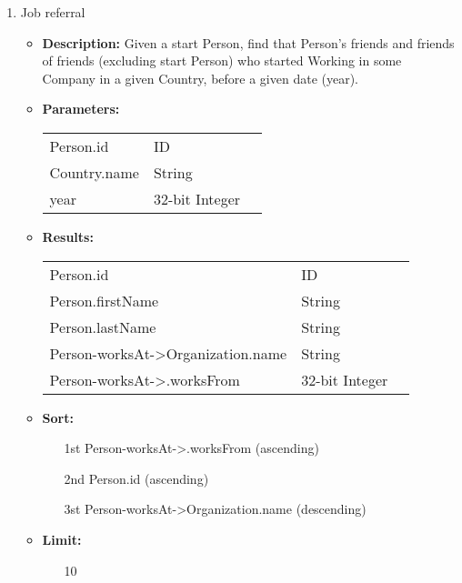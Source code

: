 {\begin{enumerate}
    \item Job referral
        \begin{itemize}
            \item \textbf{Description:}
                Given a start Person, find that Person's friends and friends of
                friends (excluding start Person) who started Working in some
                Company in a given Country, before a given date (year).
            \item \textbf{Parameters:} \\
                \begin{tabular}{lll}
                    Person.id 	 				& ID & \parbox[t]{20cm}{\par \strut} \\
                    Country.name 	 			& String & \parbox[t]{20cm}{\par \strut} \\
                    year 		 				& 32-bit Integer & \parbox[t]{20cm}{\par \strut} \\
                \end{tabular}
            \item \textbf{Results:} \\
                \begin{tabular}{lll}
                    Person.id 	 						& ID & \parbox[t]{20cm}{\par \strut} \\
                    Person.firstName 	 				& String & \parbox[t]{20cm}{\par \strut} \\
                    Person.lastName 	 				& String & \parbox[t]{20cm}{\par \strut} \\
                    Person-worksAt->Organization.name 	& String & \parbox[t]{20cm}{\par \strut} \\
                    Person-worksAt->.worksFrom 	 		& 32-bit Integer & \parbox[t]{20cm}{\par \strut} \\
                \end{tabular}
            \item \textbf{Sort:}
                  \begin{itemize}
                    \item[1st] Person-worksAt->.worksFrom (ascending)
                    \item[2nd] Person.id (ascending)
                    \item[3st] Person-worksAt->Organization.name (descending)
                  \end{itemize}
            \item \textbf{Limit:}
                  \begin{itemize}
                    \item[] 10
                  \end{itemize}
        \end{itemize}


\end{enumerate}}
